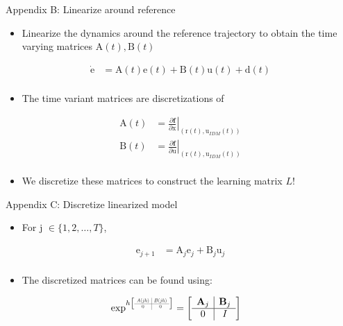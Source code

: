 \documentclass[handout]{beamer}
\newcommand{\boldvec}[1]{\boldsymbol{\mathrm{#1}}}
\let\vec\boldvec
\newcommand\at[2]{\left.#1\right|_{#2}} %
\newcommand\scalemath[2]{\scalebox{#1}{\mbox{\ensuremath{\displaystyle #2}}}} %
\newcommand{\state}{\vec{x}} %
\newcommand{\error}{\vec{e}} %
\newcommand{\traj}{\vec{r}} %
\newcommand{\linDist}{\vec{d}} %
\newcommand{\sysInput}{\vec{u}} %
\begin{document}
\begin{frame}{Appendix B: Linearize around reference}
\begin{itemize}
\item Linearize the dynamics around the reference trajectory to obtain the time varying matrices $\vec{A}(t), \vec{B}(t)$
\end{itemize}
\begin{equation*}
\begin{aligned}
\dot{\error} &= \vec{A}(t)\error(t) + \vec{B}(t)\sysInput(t) + \linDist(t)\\
\end{aligned}
\end{equation*} 
\begin{itemize}
\item The time variant matrices are discretizations of 
\end{itemize}
\begin{equation*}
\begin{aligned}
\vec{A}(t) & = \at{\frac{\partial{\mathbf{f}}}{\partial{\state}}}{(\traj(t),\sysInput_{IDM}(t))} \\
\vec{B}(t) & = \at{\frac{\partial{\mathbf{f}}}{\partial{\sysInput}}}{(\traj(t),\sysInput_{IDM}(t))} \\
\end{aligned}
\end{equation*}
\begin{itemize}
\item We discretize these matrices to construct the learning matrix $L$! 
\end{itemize}
\end{frame}
%
\begin{frame}{Appendix C: Discretize linearized model}
\begin{itemize}
\item For j $\in \{ 1, 2, \ldots, T \}$, 
\end{itemize}
\begin{equation*}
\begin{aligned}
\error_{j+1} &= \vec{A}_j\error_j + \vec{B}_j\sysInput_j \\
\end{aligned}
\end{equation*}
\begin{itemize}
\item The discretized matrices can be found using: 
\linebreak
\end{itemize}
\begin{equation*}
\begin{aligned}
\exp^{h
\left[
\scalemath{0.5}{
\begin{array}{c|c}
A(jh) & B(jh) \\ \hline
0 & 0
\end{array}}\right]}
&= 
\left[
\begin{array}{c|c}
\vec{A}_j & \vec{B}_j \\ \hline
0 & I
\end{array}\right]
\end{aligned}
\end{equation*}
\end{frame}
%
\end{document}
